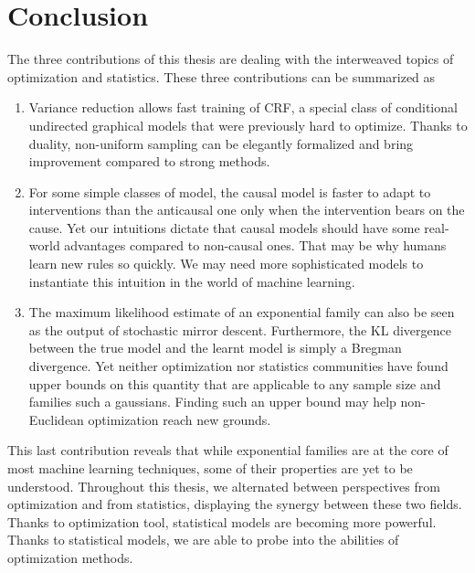 \chapter{Conclusion}
\label{chap:discussion}

The three contributions of this thesis are dealing with  the interweaved topics of optimization and statistics. 
These three contributions can be summarized as 
\begin{enumerate}
	\item Variance reduction allows fast training of CRF, a special class of conditional undirected graphical models that were previously hard to optimize. Thanks to duality, non-uniform sampling can be elegantly formalized and bring improvement compared to strong methods.
	\item For some simple classes of model, the causal model is faster to adapt to interventions than the anticausal one only when the intervention bears on the cause. 
	Yet our intuitions dictate that causal models should have some real-world advantages compared to non-causal ones. 
	That may be why humans learn new rules so quickly.
	We may need more sophisticated models to instantiate this intuition in the world of machine learning.
	 \item The maximum likelihood estimate of an exponential family can also be seen as the output of stochastic mirror descent. Furthermore, the KL divergence between the true model and the learnt model is simply a Bregman divergence. Yet neither optimization nor statistics communities have found upper bounds on this quantity that are applicable to any sample size and families such a gaussians. 
	 Finding such an upper bound may help non-Euclidean optimization reach new grounds.
\end{enumerate}
This last contribution reveals that while exponential families are at the core of most machine learning techniques, some of their properties are yet to be understood.
Throughout this thesis, we alternated between perspectives from optimization and from statistics, displaying the synergy between these two fields. Thanks to optimization tool, statistical models are becoming more powerful. Thanks to statistical models, we are able to probe into the abilities of optimization methods.


